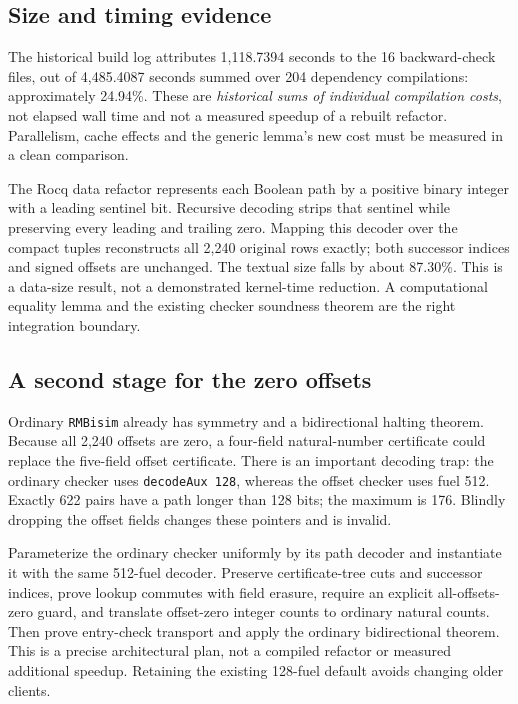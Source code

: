 \documentclass[11pt]{article}
\begin{document}
\subsection{Size and timing evidence}
The historical build log attributes 1,118.7394 seconds to the 16 backward-check files, out of 4,485.4087 seconds summed over 204 dependency compilations: approximately 24.94\%. These are \emph{historical sums of individual compilation costs}, not elapsed wall time and not a measured speedup of a rebuilt refactor. Parallelism, cache effects and the generic lemma's new cost must be measured in a clean comparison.

The Rocq data refactor represents each Boolean path by a positive binary integer with a leading sentinel bit. Recursive decoding strips that sentinel while preserving every leading and trailing zero. Mapping this decoder over the compact tuples reconstructs all 2,240 original rows exactly; both successor indices and signed offsets are unchanged. The textual size falls by about 87.30\%. This is a data-size result, not a demonstrated kernel-time reduction. A computational equality lemma and the existing checker soundness theorem are the right integration boundary.

\subsection{A second stage for the zero offsets}
Ordinary \texttt{RMBisim} already has symmetry and a bidirectional halting theorem. Because all 2,240 offsets are zero, a four-field natural-number certificate could replace the five-field offset certificate. There is an important decoding trap: the ordinary checker uses \texttt{decodeAux 128}, whereas the offset checker uses fuel 512. Exactly 622 pairs have a path longer than 128 bits; the maximum is 176. Blindly dropping the offset fields changes these pointers and is invalid.

Parameterize the ordinary checker uniformly by its path decoder and instantiate it with the same 512-fuel decoder. Preserve certificate-tree cuts and successor indices, prove lookup commutes with field erasure, require an explicit all-offsets-zero guard, and translate offset-zero integer counts to ordinary natural counts. Then prove entry-check transport and apply the ordinary bidirectional theorem. This is a precise architectural plan, not a compiled refactor or measured additional speedup. Retaining the existing 128-fuel default avoids changing older clients.
\end{document}
